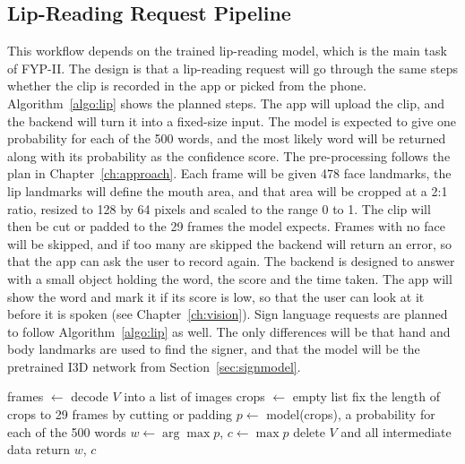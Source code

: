 \documentclass{FastFyp}
\begin{document}
\subsection{Lip-Reading Request Pipeline}
This workflow depends on the trained lip-reading model, which is the main task of FYP-II. The design is that a lip-reading request will go through the same steps whether the clip is recorded in the app or picked from the phone. Algorithm~\ref{algo:lip} shows the planned steps. The app will upload the clip, and the backend will turn it into a fixed-size input. The model is expected to give one probability for each of the 500 words, and the most likely word will be returned along with its probability as the confidence score. The pre-processing follows the plan in Chapter~\ref{ch:approach}. Each frame will be given 478 face landmarks, the lip landmarks will define the mouth area, and that area will be cropped at a 2:1 ratio, resized to 128 by 64 pixels and scaled to the range 0 to 1. The clip will then be cut or padded to the 29 frames the model expects. Frames with no face will be skipped, and if too many are skipped the backend will return an error, so that the app can ask the user to record again. The backend is designed to answer with a small object holding the word, the score and the time taken. The app will show the word and mark it if its score is low, so that the user can look at it before it is spoken (see Chapter~\ref{ch:vision}). Sign language requests are planned to follow Algorithm~\ref{algo:lip} as well. The only differences will be that hand and body landmarks are used to find the signer, and that the model will be the pretrained I3D network from Section~\ref{sec:signmodel}.
\begin{algorithm}[H]
 frames $\leftarrow$ decode $V$ into a list of images\;
 crops $\leftarrow$ empty list\;
 fix the length of crops to 29 frames by cutting or padding\;
 $p \leftarrow$ model(crops), a probability for each of the 500 words\;
 $w \leftarrow \arg\max p$, \quad $c \leftarrow \max p$\;
 delete $V$ and all intermediate data\;
 return $w$, $c$\;
 \caption{Planned lip-reading request processing in the backend}
 \label{algo:lip}
\end{algorithm}
\end{document}
